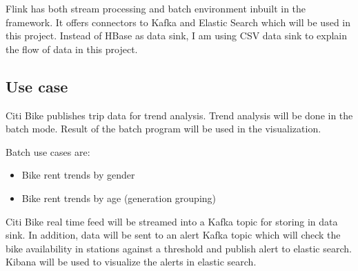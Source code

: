 \documentclass{sig-alternate-05-2015}
\begin{document}
Flink has both stream processing and batch environment inbuilt in the framework. It offers connectors to Kafka and Elastic Search which will be used in this project. Instead of HBase as data sink, I am using CSV data sink to explain the flow of data in this project. 

\subsection{Use case}

Citi Bike publishes trip data for trend analysis. Trend analysis will be done in the batch mode. Result of the batch program will be used in the visualization.

Batch use cases are:
\begin{itemize}
    \item Bike rent trends by gender
    \item Bike rent trends by age (generation grouping)
\end{itemize}

Citi Bike real time feed will be streamed into a Kafka topic for storing in data sink. In addition, data will be sent to an alert Kafka topic which will check the bike availability in stations against a threshold and publish alert to elastic search. Kibana will be used to visualize the alerts in elastic search.
\end{document}
